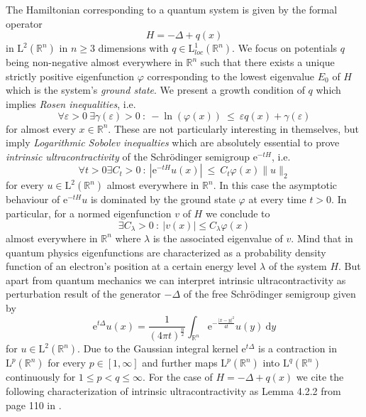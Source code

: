 \documentclass[12pt,longbibliography]{article}
\def\R{\mathbb{R}}
\theoremstyle{definition}
\theoremstyle{remark}
\theoremstyle{example}
\begin{document}
The Hamiltonian corresponding to a quantum system is given by the formal operator
\begin{equation}
H =  -\Delta + q(x)
\end{equation}
in $\mathrm{L}^{2}(\R^{n})$ in $n \geq 3$ dimensions with $q \in \mathrm{L}^{1}_{loc}\left( \R^{n} \right)$. We focus on
potentials $q$ being non-negative almost everywhere in $\R^{n}$ such that there exists a unique strictly positive 
eigenfunction $\varphi$ corresponding to the lowest eigenvalue $E_{0}$ of $H$ which is the system's \textit{ground state}.
We present a growth condition of $q$ which implies \textit{Rosen inequalities}, i.e.
\begin{equation}
\forall \varepsilon > 0 \ \exists \gamma(\varepsilon) > 0 \ : \ - \ln \left( \varphi(x) \right) \ \leq \ \varepsilon q(x) + \gamma(\varepsilon)
\end{equation}
for almost every $x \in \R^{n}$. These are not particularly interesting in themselves, but imply 
\textit{Logarithmic Sobolev inequalties} which are absolutely essential to prove 
\textit{intrinsic ultracontractivity} of the Schrödinger semigroup $\mathrm{e}^{-tH}$, i.e.
\begin{equation}
\forall t > 0 \exists C_{t} > 0 \ : \ \left| \mathrm{e}^{-tH}u (x)  \right| \ \leq \ C_{t} \varphi(x) \| u \|_{2}
\end{equation}
for every $u \in \mathrm{L}^{2}(\R^{n})$ almost everywhere in $\R^{n}$. In this case the asymptotic behaviour 
of $\mathrm{e}^{-tH}u$ is dominated by the ground state $\varphi$ at every time $t>0$. In particular, for a normed 
eigenfunction $v$ of $H$ we conclude to 
\begin{equation}
\exists C_{\lambda} > 0 \ : \ |v(x)| \leq C_{\lambda} \varphi(x)
\end{equation}
almost everywhere in $\R^{n}$ where $\lambda$ is the associated eigenvalue of $v$. Mind that in quantum physics
eigenfunctions are characterized as a probability density function of an electron's position at a certain energy level 
$\lambda$ of the system $H$.
But apart from quantum mechanics we can interpret intrinsic ultracontractivity as perturbation result of the generator $-\Delta$ 
of the free Schrödinger semigroup given by
\begin{equation}
\mathrm{e}^{t\Delta}u (x) = \frac{1}{(4 \pi t)^{\frac{n}{2}}} 
\int_{\R^{n}} \mathrm{e}^{-\frac{|x-y|^{2}}{4t}} u(y) \ \mathrm{d}y
\end{equation} 
for $u \in \mathrm{L}^{2}(\R^{n})$. Due to the Gaussian integral kernel $\mathrm{e}^{t\Delta}$ is 
a contraction in $\mathrm{L}^{p}(\R^{n})$ for every $p \in [1,\infty]$ and further maps $\mathrm{L}^{p}(\R^{n})$ into 
$\mathrm{L}^{q}(\R^{n})$ continuously for $1 \leq p < q \leq \infty$.
For the case of $H=-\Delta + q(x)$ we cite the following characterization of 
intrinsic ultracontractivity as Lemma 4.2.2 from page 110 in \cite{Davies07}. \\
\end{document}
